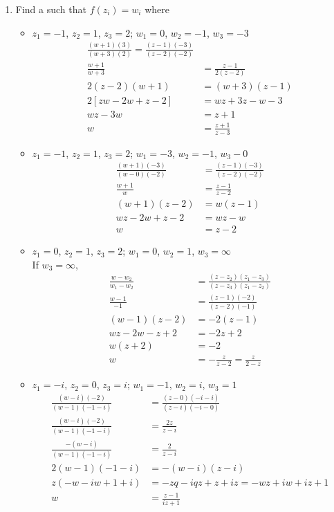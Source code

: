 \documentclass[12pt]{article}
\begin{document}
\begin{enumerate}
\item Find a \mobt such that $f(z_i) = w_i$ where \begin{itemize}
\item $z_1 = -1$, $z_2 = 1$, $z_3 = 2$; $w_1 = 0$, $w_2 = -1$, $w_3 = -3$ 
$$ \begin{aligned} 
\frac{(w+1)(3)}{(w+3)(2)} = \frac{(z-1)(-3)}{(z-2)(-2)} \\ \frac{w+1}{w+3} &= \frac{z-1}{2(z-2)} \\ 2(z-2)(w+1) &= (w+3)(z-1) \\ 2[zw - 2w + z - 2] &= wz + 3z - w - 3 \\ wz - 3w &= z+1 \\ w &= \frac{z+1}{z-3} 
\end{aligned} $$
\item $z_1 = -1$, $z_2 = 1$, $z_3 = 2$; $w_1 = -3$, $w_2 = -1$, $w_3 - 0$ 
$$ \begin{aligned} 
\frac{(w+1)(-3)}{(w-0)(-2)} &= \frac{(z-1)(-3)}{(z-2)(-2)} \\ \frac{w+1}{w} &= \frac{z-1}{z-2} \\ (w+1)(z-2) &= w(z-1) \\ wz -2w + z -2 &= wz - w \\ w &= z-2 
\end{aligned} $$
\item $z_1 = 0$, $z_2 = 1$, $z_3 = 2$; $w_1 = 0$, $w_2 = 1$, $w_3 = \infty$ \\ If $w_3 = \infty$,
$$ \begin{aligned} 
\frac{w-w_2}{w_1-w_2} &= \frac{(z-z_2)(z_1-z_3)}{(z-z_3)(z_1-z_2)} \\ \frac{w-1}{-1} &= \frac{(z-1)(-2)}{(z-2)(-1)} \\ (w-1)(z-2) &= -2(z-1) \\ wz - 2w - z + 2 &= -2z + 2 \\ w(z+2) &= -2 \\ w &= -\frac{z}{z-2} = \frac{z}{2-z}
\end{aligned} $$
\item $z_1 = -i$, $z_2 = 0$, $z_3 = i$; $w_1 = -1$, $w_2 = i$, $w_3 = 1$ 
$$ \begin{aligned} 
\frac{(w-i)(-2)}{(w-1)(-1-i)} &= \frac{(z-0)(-i - i)}{(z-i)(-i - 0)} \\ \frac{(w-i)(-2)}{(w-1)(-1-i)} &= \frac{2z}{z-i} \\ \frac{-(w-i)}{(w-1)(-1-i)} &= \frac{2}{z-i} \\ 2(w-1)(-1-i) &= -(w-i)(z-i) \\ z(-w-iw + 1 + i) &= -zq - iqz + z + iz = -wz + iw + iz + 1 \\ w &= \frac{z-1}{iz+1}

\end{aligned}$$
\end{itemize}
\end{enumerate}
\end{document}
